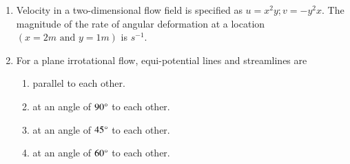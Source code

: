 \documentclass[journal]{IEEEtran}
\begin{document}
\begin{enumerate}
    \item Velocity in a two-dimensional flow field is specified as $u=x^2y;v=-y^2x$. The magnitude of the rate of angular deformation at a location $(x=2m \text{ and } y=1m)$ is \underline{\hspace{1cm}}$s^{-1}$.

    \item For a plane irrotational flow, equi-potential lines and streamlines are
        \begin{enumerate}
            \item parallel to each other.
            \item at an angle of $90\degree$ to each other.
            \item at an angle of $45\degree$ to each other.
            \item at an angle of $60\degree$ to each other.
        \end{enumerate}

    \end{enumerate}
\end{document}
